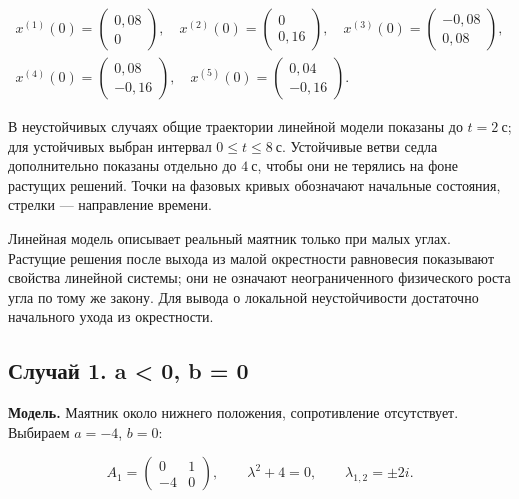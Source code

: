 \begin{equation}
\begin{gathered}
x^{(1)}(0)=\begin{pmatrix}0{,}08\\0\end{pmatrix},\quad
x^{(2)}(0)=\begin{pmatrix}0\\0{,}16\end{pmatrix},\quad
x^{(3)}(0)=\begin{pmatrix}-0{,}08\\0{,}08\end{pmatrix},\\[6pt]
x^{(4)}(0)=\begin{pmatrix}0{,}08\\-0{,}16\end{pmatrix},\quad
x^{(5)}(0)=\begin{pmatrix}0{,}04\\-0{,}16\end{pmatrix}.
\end{gathered}
\end{equation}

В неустойчивых случаях общие траектории линейной модели показаны до $t=2\ \mathrm{с}$; для устойчивых выбран интервал $0\leq t\leq8\ \mathrm{с}$. Устойчивые ветви седла дополнительно показаны отдельно до $4\ \mathrm{с}$, чтобы они не терялись на фоне растущих решений. Точки на фазовых кривых обозначают начальные состояния, стрелки — направление времени.

Линейная модель описывает реальный маятник только при малых углах. Растущие решения после выхода из малой окрестности равновесия показывают свойства линейной системы; они не означают неограниченного физического роста угла по тому же закону. Для вывода о локальной неустойчивости достаточно начального ухода из окрестности.

\subsection{Случай 1. a < 0, b = 0}

\textbf{Модель.} Маятник около нижнего положения, сопротивление отсутствует. Выбираем $a=-4$, $b=0$:

\begin{equation}
A_1=\begin{pmatrix}0&1\\-4&0\end{pmatrix},\qquad
\lambda^2+4=0,\qquad \lambda_{1,2}=\pm2i.
\end{equation}


